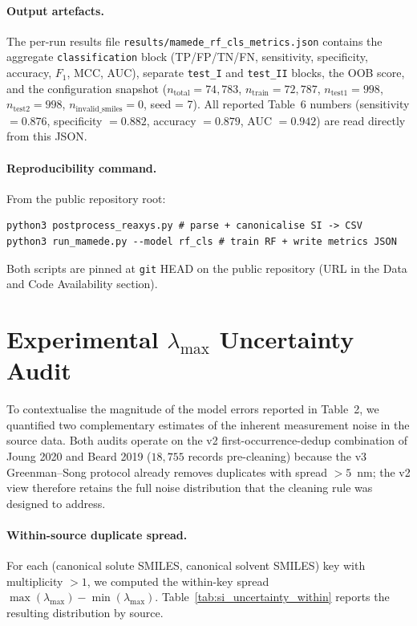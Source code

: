 \documentclass[journal=jcisd8,manuscript=suppinfo]{achemso}
\begin{document}
\paragraph{Output artefacts.}
The per-run results file \texttt{results/mamede\_rf\_cls\_metrics.json} contains the aggregate \texttt{classification} block (TP/FP/TN/FN, sensitivity, specificity, accuracy, $F_1$, MCC, AUC), separate \texttt{test\_I} and \texttt{test\_II} blocks, the OOB score, and the configuration snapshot ($n_{\text{total}} = 74{,}783$, $n_{\text{train}} = 72{,}787$, $n_{\text{test1}} = 998$, $n_{\text{test2}} = 998$, $n_{\text{invalid\_smiles}} = 0$, seed = 7). All reported Table~6 numbers (sensitivity $= 0.876$, specificity $= 0.882$, accuracy $= 0.879$, AUC $= 0.942$) are read directly from this JSON.

\paragraph{Reproducibility command.}
From the public repository root:
\begin{verbatim}
python3 postprocess_reaxys.py # parse + canonicalise SI -> CSV
python3 run_mamede.py --model rf_cls # train RF + write metrics JSON
\end{verbatim}
Both scripts are pinned at \texttt{git} HEAD on the public repository (URL in the Data and Code Availability section).


\section{Experimental $\lambda_{\max}$ Uncertainty Audit}
\label{si:experimental_uncertainty}

To contextualise the magnitude of the model errors reported in Table~2, we quantified two complementary estimates of the inherent measurement noise in the source data. Both audits operate on the v2 first-occurrence-dedup combination of Joung 2020 and Beard 2019 ($18{,}755$ records pre-cleaning) because the v3 Greenman--Song protocol already removes duplicates with spread $> 5$~nm; the v2 view therefore retains the full noise distribution that the cleaning rule was designed to address.

\paragraph{Within-source duplicate spread.}
For each (canonical solute SMILES, canonical solvent SMILES) key with multiplicity $> 1$, we computed the within-key spread $\max(\lambda_{\max}) - \min(\lambda_{\max})$. Table~\ref{tab:si_uncertainty_within} reports the resulting distribution by source.
\end{document}
